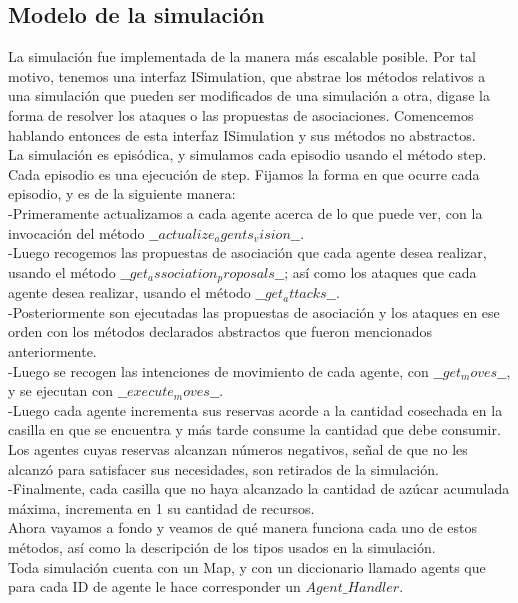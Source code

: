 \documentclass[11pt]{article}
\begin{document}
\subsection{Modelo de la simulación}
La simulación fue implementada de la manera más escalable posible. Por tal motivo, tenemos una interfaz ISimulation, que abstrae los métodos relativos a una simulación que pueden ser modificados de una simulación a otra, digase la forma de resolver los ataques o las propuestas de asociaciones. Comencemos hablando entonces de esta interfaz ISimulation y sus métodos no abstractos.\\
La simulación es episódica, y simulamos cada episodio usando el método step. Cada episodio es una ejecución de step. Fijamos la forma en que ocurre cada episodio, y es de la siguiente manera:\\
-Primeramente actualizamos a cada agente acerca de lo que puede ver, con la invocación del método $\_\_actualize_agents_vision\_\_$.\\
-Luego recogemos las propuestas de asociación que cada agente desea realizar, usando el método $\_\_get_association_proposals\_\_$; así como los ataques que cada agente desea realizar, usando el método $\_\_get_attacks\_\_$.\\
-Posteriormente son ejecutadas las propuestas de asociación y los ataques en ese orden con los métodos declarados abstractos que fueron mencionados anteriormente.\\
-Luego se recogen las intenciones de movimiento de cada agente, con $\_\_get_moves\_\_$, y se ejecutan con $\_\_execute_moves\_\_$.\\
-Luego cada agente incrementa sus reservas acorde a la cantidad cosechada en la casilla en que se encuentra y más tarde consume la cantidad que debe consumir. Los agentes cuyas reservas alcanzan números negativos, señal de que no les alcanzó para satisfacer sus necesidades, son retirados de la simulación.\\
-Finalmente, cada casilla que no haya alcanzado la cantidad de azúcar acumulada máxima, incrementa en 1 su cantidad de recursos.\\
Ahora vayamos a fondo y veamos de qué manera funciona cada uno de estos métodos, así como la descripción de los tipos usados en la simulación.\\
Toda simulación cuenta con un Map, y con un diccionario llamado agents que para cada ID de agente le hace corresponder un $Agent\_Handler$.\\
\end{document}
